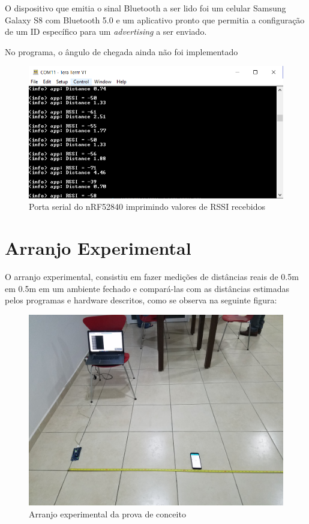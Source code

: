 O dispositivo que emitia o sinal Bluetooth a ser lido foi um celular Samsung Galaxy S8 com Bluetooth 5.0 e um aplicativo pronto que permitia a configuração de um ID específico para um \textit{advertising} a ser enviado.

No programa, o ângulo de chegada ainda não foi implementado

\begin{figure}[H]
	\centering
	\includegraphics[scale = 0.85]{images/rssi_terminal.png}
	\caption{Porta serial do nRF52840 imprimindo valores de RSSI recebidos}
	\label{fig:rssi_terminal}
\end{figure}

\section{Arranjo Experimental}
O arranjo experimental, consistiu em fazer medições de distâncias reais de 0.5m em 0.5m em um ambiente fechado e compará-las com as distâncias estimadas pelos programas e hardware descritos, como se observa na seguinte figura:

\begin{figure}[H]
	\centering
	\includegraphics[scale = 0.1]{images/setup_poc.jpg}
	\caption{Arranjo experimental da prova de conceito}
	\label{fig:setup_poc}
\end{figure}


